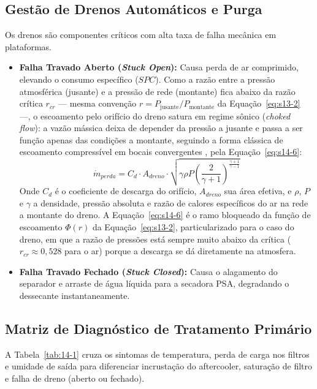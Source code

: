 \documentclass[12pt,a4paper]{article}
\numberwithin{equation}{section}
\numberwithin{table}{section}
\numberwithin{figure}{section}
\begin{document}
{	\subsection{Gestão de Drenos Automáticos e Purga}
	Os drenos são componentes críticos com alta taxa de falha mecânica em plataformas.
	\begin{itemize}
		\item \textbf{Falha Travado Aberto (\textit{Stuck Open}):} Causa perda de ar comprimido, elevando o consumo específico ($SPC$). Como a razão entre a pressão atmosférica (jusante) e a pressão de rede (montante) fica abaixo da razão crítica $r_{cr}$ — mesma convenção $r=P_{\text{jusante}}/P_{\text{montante}}$ da Equação~\eqref{eq:s13-2} —, o escoamento pelo orifício do dreno satura em regime sônico (\textit{choked flow}): a vazão mássica deixa de depender da pressão a jusante e passa a ser função apenas das condições a montante, seguindo a forma clássica de escoamento compressível em bocais convergentes \cite{white}, pela Equação~\eqref{eq:s14-6}:
		\begin{equation}\label{eq:s14-6}
 \dot{m}_{perda} = C_d \cdot A_{dreno} \cdot \sqrt{\gamma \rho P \left( \frac{2}{\gamma+1} \right)^{\frac{\gamma+1}{\gamma-1}}}
\end{equation}
		Onde $C_d$ é o coeficiente de descarga do orifício, $A_{dreno}$ sua área efetiva, e $\rho$, $P$ e $\gamma$ a densidade, pressão absoluta e razão de calores específicos do ar na rede a montante do dreno. A Equação~\eqref{eq:s14-6} é o ramo bloqueado da função de escoamento $\Phi(r)$ da Equação~\eqref{eq:s13-2}, particularizado para o caso do dreno, em que a razão de pressões está sempre muito abaixo da crítica ($r_{cr} \approx 0{,}528$ para o ar) porque a descarga se dá diretamente na atmosfera.
		\item \textbf{Falha Travado Fechado (\textit{Stuck Closed}):} Causa o alagamento do separador e arraste de água líquida para a secadora PSA, degradando o dessecante instantaneamente.
	\end{itemize}
	
	\subsection{Matriz de Diagnóstico de Tratamento Primário}
	A Tabela~\ref{tab:14-1} cruza os sintomas de temperatura, perda de carga nos filtros e umidade de saída para diferenciar incrustação do aftercooler, saturação de filtro e falha de dreno (aberto ou fechado).

}
\end{document}
